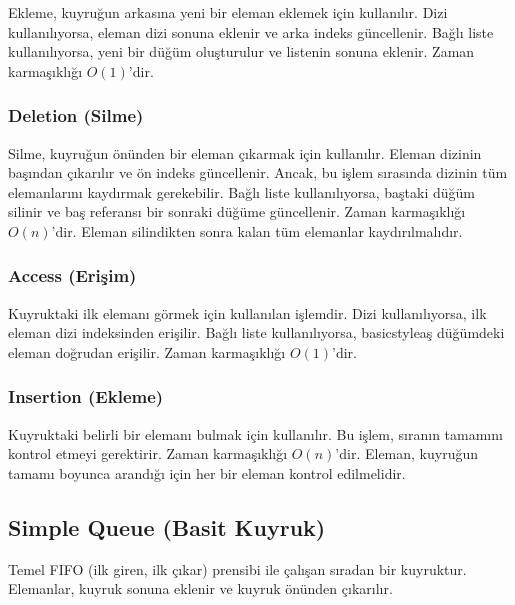 Ekleme, kuyruğun arkasına yeni bir eleman eklemek için kullanılır. Dizi kullanılıyorsa, eleman dizi sonuna eklenir ve arka indeks güncellenir. Bağlı liste kullanılıyorsa, yeni bir düğüm oluşturulur ve listenin sonuna eklenir. Zaman karmaşıklığı $O(1)$'dir. 

\subsubsection{Deletion (Silme)}

Silme, kuyruğun önünden bir eleman çıkarmak için kullanılır. Eleman dizinin başından çıkarılır ve ön indeks güncellenir. Ancak, bu işlem sırasında dizinin tüm elemanlarını kaydırmak gerekebilir. Bağlı liste kullanılıyorsa, baştaki düğüm silinir ve baş referansı bir sonraki düğüme güncellenir. Zaman karmaşıklığı $O(n)$'dir. Eleman silindikten sonra kalan tüm elemanlar kaydırılmalıdır.

\subsubsection{Access (Erişim)}

Kuyruktaki ilk elemanı görmek için kullanılan işlemdir. Dizi kullanılıyorsa, ilk eleman dizi indeksinden erişilir. Bağlı liste kullanılıyorsa, basicstyleaş düğümdeki eleman doğrudan erişilir. Zaman karmaşıklığı $O(1)$'dir. 

\subsubsection{Insertion (Ekleme)}

Kuyruktaki belirli bir elemanı bulmak için kullanılır. Bu işlem, sıranın tamamını kontrol etmeyi gerektirir. Zaman karmaşıklığı $O(n)$'dir. Eleman, kuyruğun tamamı boyunca arandığı için her bir eleman kontrol edilmelidir.

\newpage

\subsection{Simple Queue (Basit Kuyruk)}

Temel FIFO (ilk giren, ilk çıkar) prensibi ile çalışan sıradan bir kuyruktur. Elemanlar, kuyruk sonuna eklenir ve kuyruk önünden çıkarılır.


